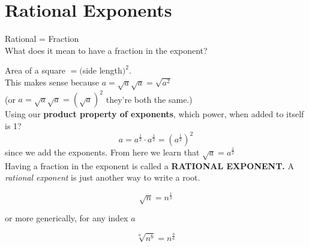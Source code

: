 \documentclass[12pt]{article}
\begin{document}
\section{Rational Exponents}

Rational = Fraction \\

What does it mean to have a fraction in the exponent?\\

\begin{center}
\end{center}


Area of a square $=($side length$)^2$.\\

This makes sense because $a=\sqrt{a} \sqrt{a} = \sqrt{a^2}$\\

(or $a=\sqrt{a} \sqrt{a} = (\sqrt{a})^2$ they're both the same.)\\

Using our \textbf{product property of exponents}, which power, when added to itself is 1? $$a=a^{\frac{1}{2}} \cdot a^{\frac{1}{2}}=\left(a^{\frac{1}{2}}\right)^2$$ since we add the exponents. From here we learn that $\sqrt{a}=a^{\frac{1}{2}}$\\

Having a fraction in the exponent is called a \textbf{RATIONAL EXPONENT.} A \textit{rational exponent} is just another way to write a root. 

\begin{large}
	$$\sqrt{n}= n^{\frac{1}{2}}$$

\end{large}


or more generically, for any index $a$\\

\begin{large}

	$$\sqrt[a]{n^b}=n^{\frac{b}{a}}$$ 
	
\end{large}
\end{document}
